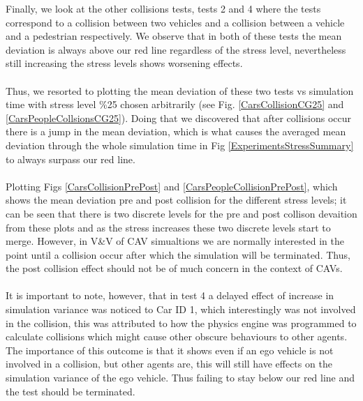 \noindent Finally, we look at the other collisions tests, tests 2 and 4 where the tests correspond to a collision between two vehicles and a collision between a vehicle and a pedestrian respectively. 
We observe that in both of these tests the mean deviation is always above our red line regardless of the stress level, nevertheless still increasing the stress levels shows worsening effects. \\\\
\noindent Thus, we resorted to plotting the mean deviation of these two tests vs simulation time with stress level \%25 chosen arbitrarily (see Fig. \ref{CarsCollisionCG25} and \ref{CarsPeopleCollsionsCG25}). 
Doing that we discovered that after collisions occur there is a jump in the mean deviation, which is what causes the averaged mean deviation through the whole simulation time in Fig \ref{ExperimentsStressSummary} to always surpass our red line.\\\\
\noindent Plotting Figs \ref{CarsCollisionPrePost} and \ref{CarsPeopleCollisionPrePost}, which shows the mean deviation pre and post collision for the different stress levels; it can be seen that there is two discrete levels for the pre and post collison devaition from these plots and as the stress increases these two discrete levels start to merge. 
However, in V\&V of CAV simualtions we  are normally interested in the point until a collision occur after which the simulation will be terminated. Thus, the post collision effect should not be of much concern in the context of CAVs.\\\\
\noindent It is important to note, however, that in test 4 a delayed effect of increase in simulation variance was noticed to Car ID 1, which interestingly was not involved in the collision, this was attributed to how the physics engine was programmed to calculate collisions which might cause other obscure behaviours to other agents. The importance of this outcome is that it shows even if an ego vehicle is not involved in a collision, but other agents are, this will still have effects on the simulation variance of the ego vehicle. Thus failing to stay below our red line and the test should be terminated.


